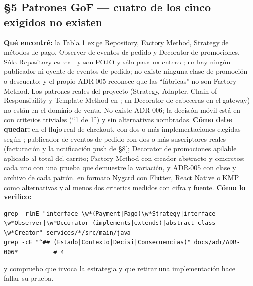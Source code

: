 \subsection*{\S5 Patrones GoF --- cuatro de los cinco exigidos no existen}
\textbf{Qu\'e encontr\'e:} la Tabla 1 exige Repository, Factory Method, Strategy de m\'etodos de pago, Observer de eventos de pedido y Decorator de promociones. S\'olo Repository es real.  y  son POJO y  s\'olo pasa un entero ; no hay ning\'un publicador ni oyente de eventos de pedido; no existe ninguna clase de promoci\'on o descuento; y el propio ADR-005 reconoce que las ``f\'abricas'' no son Factory Method. Los patrones reales del proyecto (Strategy, Adapter, Chain of Responsibility y Template Method en ; un Decorator de cabeceras en el gateway) no est\'an en el dominio de venta. No existe ADR-006; la decisi\'on m\'ovil est\'a en  con criterios triviales (``1 de 1'') y sin alternativas nombradas. \textbf{C\'omo debe quedar:} en el flujo real de checkout,  con dos o m\'as implementaciones elegidas seg\'un ; publicador de eventos de pedido con dos o m\'as suscriptores reales (facturaci\'on y la notificaci\'on push de \S8); Decorator de promociones apilable aplicado al total del carrito; Factory Method con creador abstracto y concretos; cada uno con una prueba que demuestre la variaci\'on, y ADR-005 con clase y archivo de cada patr\'on.  en formato Nygard con Flutter, React Native o KMP como alternativas y al menos dos criterios medidos con cifra y fuente. \textbf{C\'omo lo verifico:}\begin{verbatim}
grep -rlnE "interface \w*(Payment|Pago)\w*Strategy|interface \w*Observer|\w*Decorator (implements|extends)|abstract class \w*Creator" services/*/src/main/java
grep -cE "^## (Estado|Contexto|Decisi|Consecuencias)" docs/adr/ADR-006*          # 4
\end{verbatim}
y compruebo que  invoca la estrategia y que retirar una implementaci\'on hace fallar su prueba.

